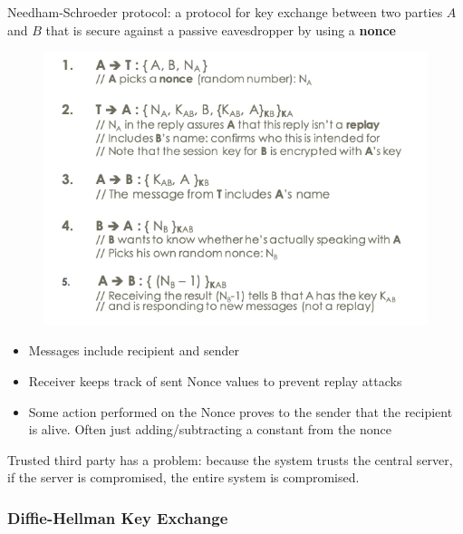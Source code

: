 \documentclass[../notes.tex]{subfiles}
\begin{document}
\begin{definition}
    Needham-Schroeder protocol: a protocol for key exchange between two parties $ A $ and $ B $ that is secure against a passive eavesdropper by using a \textbf{nonce} 

    \begin{figure}[H]
        \centering
        \includegraphics[width=0.8\linewidth]{img/image_2023-02-10-16-55-54.png}
    \end{figure}

    \begin{itemize}
        \item Messages include recipient and sender
        \item Receiver keeps track of sent Nonce values to prevent replay attacks
        \item Some action performed on the Nonce proves to the sender that the recipient is alive. Often just adding/subtracting a constant from the nonce
    \end{itemize}

Trusted third party has a problem: because the system trusts the central server, if the server is compromised, the entire system is compromised.

\end{definition}


\subsubsection{Diffie-Hellman Key Exchange}
\end{document}
